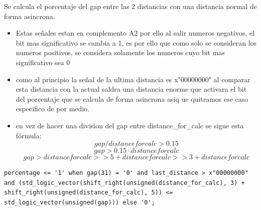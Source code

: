 Se calcula el porcentaje del gap entre las 2 distancias con una distancia normal de forma asincrona.

\begin{itemize}
    \item Estas señales estan en complemento A2 por ello al salir numeros negativos, el bit mas significativo se cambia a 1, es por ello que como solo se consideran los numeros positivos, se
     considera solamente los numeros cuyo bit mas significativo sea 0
    \item como al principio la señal de la ultima distancia es x"00000000" al comparar esta distancia con la actual saldra una distancia enorme que activara el bit del porcentaje que se calcula 
    de forma asincrona asiq ue quitramos ese caso especifico de por medio.
    \item en vez de hacer una division del gap entre distance\_for\_calc se sigue esta fórmula:
    \[ gap/distanceforcalc > 0.15\] 
    \[gap > 0.15 \cdot distanceforcalc \] 
    \[gap > distanceforcalc>> 5 + distanceforcalc>> 3 + distanceforcalc\] 
\end{itemize}

\lstset{language=VHDL, breaklines=true, basicstyle=\footnotesize}
\begin{lstlisting}[frame=single]
    percentage <= '1' when gap(31) = '0' and last_distance > x"00000000" and (std_logic_vector(shift_right(unsigned(distance_for_calc), 3) + shift_right(unsigned(distance_for_calc), 5)) <= std_logic_vector(unsigned(gap))) else '0';
\end{lstlisting}


